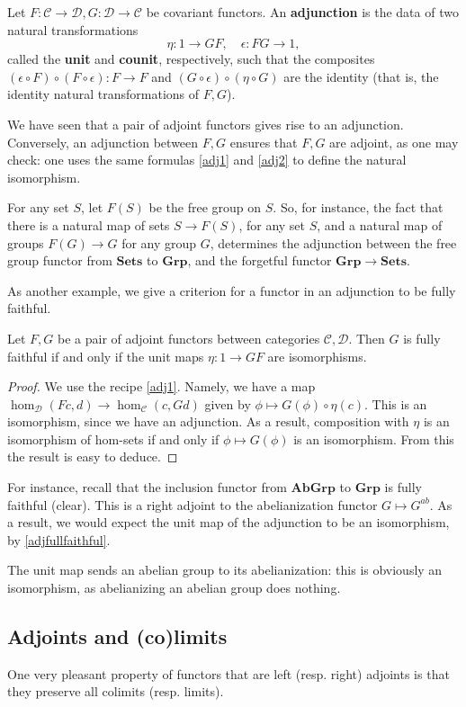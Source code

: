 \begin{definition} 
Let $F: \mathcal{C} \to \mathcal{D}, G: \mathcal{D} \to \mathcal{C}$ be
covariant functors. An \textbf{adjunction} is the data of two natural
transformations
\[ \eta: 1 \to GF, \quad \epsilon: FG \to 1,  \]
called the \textbf{unit} and \textbf{counit}, respectively, such that the
composites $(\epsilon \circ F) \circ (F \circ \epsilon): F \to F$
and $(G \circ \epsilon) \circ (\eta \circ G)$ are the identity (that is, the
identity natural transformations of $F, G$).
\end{definition} 

We have seen that a pair of adjoint functors gives rise to an adjunction. 
Conversely, an adjunction between $F, G$ ensures that $F, G$ are adjoint, as
one may check: one uses the same formulas \eqref{adj1} and \eqref{adj2} to
define the natural isomorphism.


For any set $S$, let $F(S)$ be the free group on $S$.
So, for instance, the fact that there is a natural map of sets
$S \to F(S)$, for any set $S$, and a natural map of
groups $F(G) \to G$ for any group $G$, determines the adjunction between the
free group functor from $\mathbf{Sets}$ to $\mathbf{Grp}$, and the forgetful
functor $\mathbf{Grp} \to \mathbf{Sets}$.



As another example, we give a criterion for a functor in an adjunction to be
fully faithful.

\begin{proposition} \label{adjfullfaithful}
Let $F, G$ be a pair of adjoint functors between categories $\mathcal{C}, \mathcal{D}$.
Then $G$ is fully faithful if and only if the unit maps $\eta: 1 \to GF$ are
isomorphisms.
\end{proposition} 
\begin{proof} 
We use the recipe \eqref{adj1}.
Namely, we have a map $\hom_{\mathcal{D}}(Fc, d) \to 
\hom_{\mathcal{C}}(c, Gd)$ given by 
$\phi \mapsto G(\phi) \circ \eta(c)$. This is an isomorphism, since we have an
adjunction.
As a result, composition with $\eta$ is an isomorphism of hom-sets if and only if $\phi
\mapsto G(\phi)$ is an isomorphism. From this the result is easy to deduce.
\end{proof} 

\begin{example}
For instance, recall that the inclusion functor from $\mathbf{AbGrp}$ to
$\mathbf{Grp}$ is fully faithful (clear). 
This is a right adjoint to the abelianization functor $G \mapsto G^{ab}$.
As a result, we would expect the unit map of the adjunction to be an
isomorphism, by \cref{adjfullfaithful}.

The unit map sends an abelian group to its abelianization: this is obviously an
isomorphism, as abelianizing an abelian group does nothing.
\end{example}

\subsection{Adjoints and (co)limits}
One very pleasant property of functors that are left (resp. right) adjoints is
that they preserve all colimits (resp. limits).

